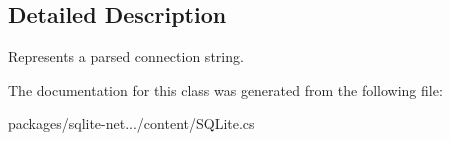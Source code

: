 \subsection{Detailed Description}
Represents a parsed connection string. 



The documentation for this class was generated from the following file\-:\begin{DoxyCompactItemize}
\item 
packages/sqlite-\/net.../content/S\-Q\-Lite.\-cs\end{DoxyCompactItemize}
